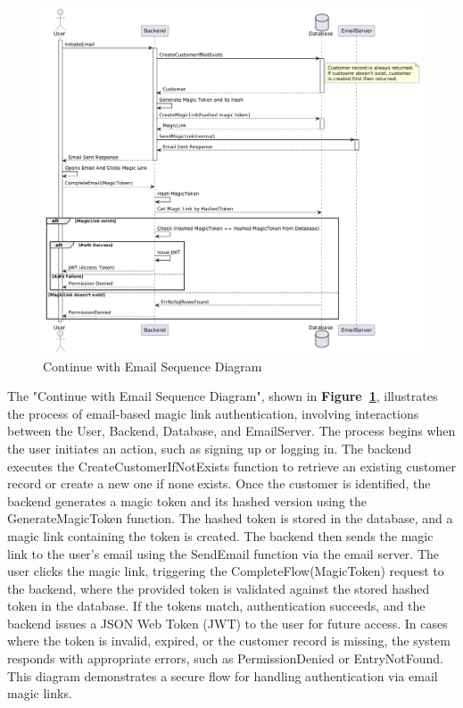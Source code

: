 \begin{figure}[!h]
  \centering
  \includegraphics[width=\textwidth]{images/docs/diagrams/sequence-diagrams/all-sequence-diagrams/Continue with Email.png}
  \caption{Continue with Email Sequence Diagram}
  \label{fig:seq/continue-with-email}
\end{figure}

The "Continue with Email Sequence Diagram", shown in \textbf{Figure~\ref{fig:seq/continue-with-email}}, illustrates the process of email-based magic link authentication, involving interactions between the User, Backend, Database, and EmailServer. The process begins when the user initiates an action, such as signing up or logging in. The backend executes the CreateCustomerIfNotExists function to retrieve an existing customer record or create a new one if none exists. Once the customer is identified, the backend generates a magic token and its hashed version using the GenerateMagicToken function. The hashed token is stored in the database, and a magic link containing the token is created. The backend then sends the magic link to the user's email using the SendEmail function via the email server. The user clicks the magic link, triggering the CompleteFlow(MagicToken) request to the backend, where the provided token is validated against the stored hashed token in the database. If the tokens match, authentication succeeds, and the backend issues a JSON Web Token (JWT) to the user for future access. In cases where the token is invalid, expired, or the customer record is missing, the system responds with appropriate errors, such as PermissionDenied or EntryNotFound. This diagram demonstrates a secure flow for handling authentication via email magic links.